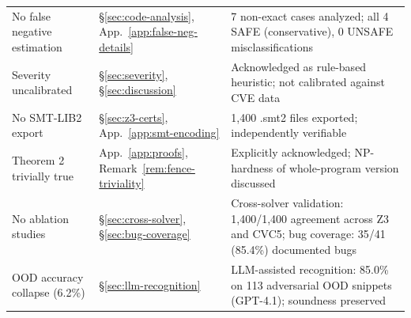 \documentclass[11pt]{article}
\begin{document}
\begin{longtable}{p{5cm}p{2cm}p{5cm}}
No false negative estimation &
  \S\ref{sec:code-analysis}, App.~\ref{app:false-neg-details} &
  7 non-exact cases analyzed; all 4 SAFE (conservative),
  0 UNSAFE misclassifications \\
Severity uncalibrated &
  \S\ref{sec:severity}, \S\ref{sec:discussion} &
  Acknowledged as rule-based heuristic; not calibrated
  against CVE data \\
No SMT-LIB2 export &
  \S\ref{sec:z3-certs}, App.~\ref{app:smt-encoding} &
  1{,}400 .smt2 files exported; independently verifiable \\
Theorem 2 trivially true &
  App.~\ref{app:proofs}, Remark~\ref{rem:fence-triviality} &
  Explicitly acknowledged; NP-hardness of whole-program
  version discussed \\
No ablation studies &
  \S\ref{sec:cross-solver}, \S\ref{sec:bug-coverage} &
  Cross-solver validation: 1{,}400/1{,}400 agreement across
  Z3 and CVC5; bug coverage: 35/41 (85.4\%) documented bugs \\
OOD accuracy collapse (6.2\%) &
  \S\ref{sec:llm-recognition} &
  LLM-assisted recognition: 85.0\% on 113 adversarial OOD
  snippets (GPT-4.1); soundness preserved \\
\end{longtable}
\end{document}
